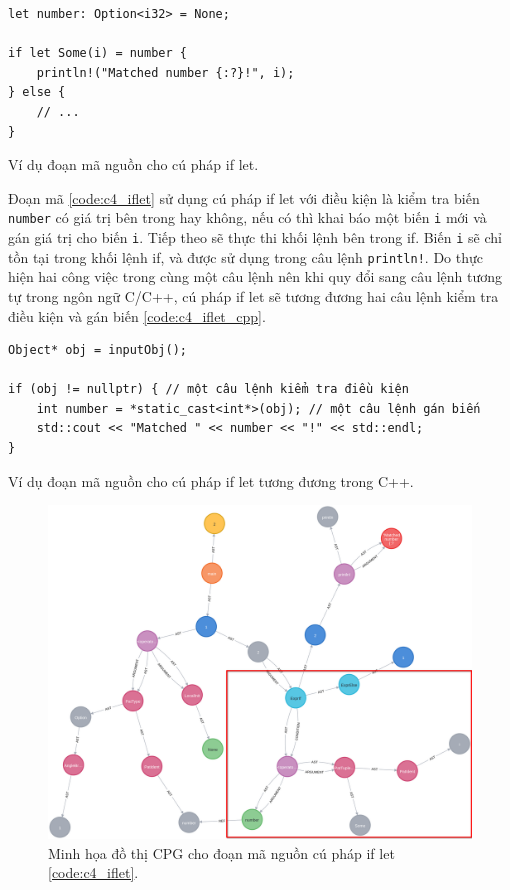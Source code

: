 \begin{listing}[H]
\begin{verbatim}
let number: Option<i32> = None;

if let Some(i) = number {
    println!("Matched number {:?}!", i);
} else {
    // ...
}
\end{verbatim}
\caption{Ví dụ đoạn mã nguồn cho cú pháp if let.}
\label{code:c4_iflet}
\end{listing}

Đoạn mã \ref{code:c4_iflet} sử dụng cú pháp if let với điều kiện là kiểm tra biến \texttt{number} có giá trị bên trong hay không, nếu có thì khai báo một biến \texttt{i} mới và gán giá trị cho biến \texttt{i}.
Tiếp theo sẽ thực thi khối lệnh bên trong if.
Biến \texttt{i} sẽ chỉ tồn tại trong khối lệnh if, và được sử dụng trong câu lệnh \texttt{println!}.
Do thực hiện hai công việc trong cùng một câu lệnh nên khi quy đổi sang câu lệnh tương tự trong ngôn ngữ C/C++, cú pháp if let sẽ tương đương hai câu lệnh kiểm tra điều kiện và gán biến \ref{code:c4_iflet_cpp}.

\begin{listing}[H]
\begin{verbatim}
Object* obj = inputObj();

if (obj != nullptr) { // một câu lệnh kiểm tra điều kiện
    int number = *static_cast<int*>(obj); // một câu lệnh gán biến
    std::cout << "Matched " << number << "!" << std::endl;
}
\end{verbatim}
\caption{Ví dụ đoạn mã nguồn cho cú pháp if let tương đương trong C++.}
\label{code:c4_iflet_cpp}
\end{listing}

\begin{figure}[H]
\includegraphics[width=1\columnwidth]{figures/c4.highlight/c4_iflet.png}
\centering
\caption{Minh họa đồ thị CPG cho đoạn mã nguồn cú pháp if let \ref{code:c4_iflet}.}
\label{img:c4_cpg_iflet}
\end{figure}

